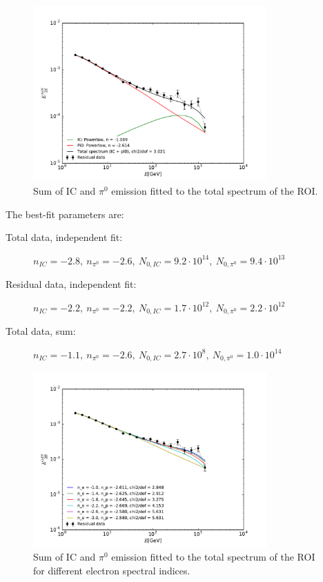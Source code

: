 \documentclass[a4paper]{article}
\begin{document}
\begin{figure}[H]
	\centering
	\includegraphics[width=0.8\textwidth]{TotalData_Sum_new_best.pdf}
    \caption{Sum of IC and $\pi^0$ emission fitted to the total spectrum of the ROI.}
    \label{TotalData_Sum}
\end{figure}

The best-fit parameters are:
\begin{description}
\item[Total data, independent fit:] $n_{IC} = -2.8,\ n_{\pi^0} = -2.6,\ N_{0, IC} = 9.2 \cdot 10^{14},\ N_{0, \pi^0} = 9.4 \cdot 10^{13}$
\item[Residual data, independent fit:] $n_{IC} = -2.2,\ n_{\pi^0} = -2.2,\ N_{0, IC} = 1.7 \cdot 10^{12},\ N_{0, \pi^0} = 2.2 \cdot 10^{12}$
\item[Total data, sum:] $n_{IC} = -1.1,\ n_{\pi^0} = -2.6,\ N_{0, IC} = 2.7 \cdot 10^{8},\ N_{0, \pi^0} = 1.0 \cdot 10^{14}$\\
\end{description}

\begin{figure}[H]
	\centering
	\includegraphics[width=0.8\textwidth]{TotalData_Sum_IC_n_fixed.pdf}
    \caption{Sum of IC and $\pi^0$ emission fitted to the total spectrum of the ROI for different electron spectral indices.}
    \label{TotalData_Sum}
\end{figure}
\end{document}
